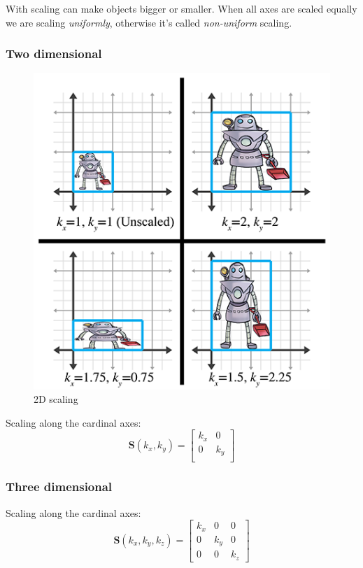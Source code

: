 \documentclass[11pt]{article}
\begin{document}
With scaling can make objects bigger or smaller. When all axes are scaled equally we are scaling \textit{uniformly}, otherwise it's called \textit{non-uniform} scaling.

\subsubsection{Two dimensional}

\begin{figure}[H]
\centering
    \includegraphics{05_scaling}
\caption{2D scaling}
\label{fig:2d-scaling}
\end{figure}

Scaling along the cardinal axes: \\
$$
\mathbf{S}(k_{x},k_{y}) =
\begin{bmatrix}
k_{x} & 0 \\
0 & k_{y} \\
\end{bmatrix}
$$

\subsubsection{Three dimensional}

Scaling along the cardinal axes: \\
$$
\mathbf{S}(k_{x},k_{y},k_{z}) = 
\begin{bmatrix}
k_{x} & 0 & 0 \\
0 & k_{y} & 0 \\
0 & 0 & k_{z}
\end{bmatrix}
$$
\end{document}
